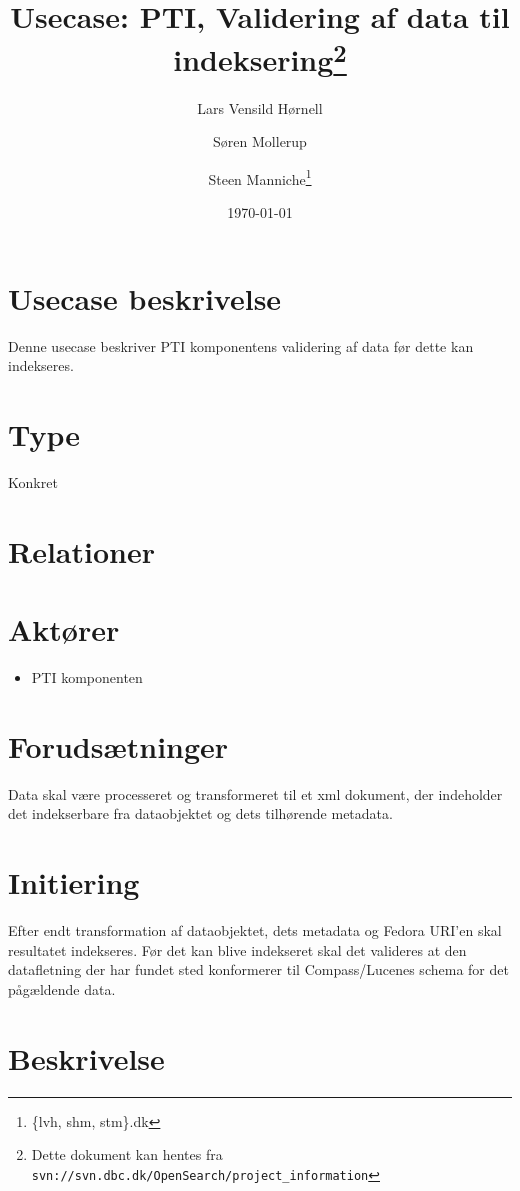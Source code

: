 \documentclass{article}
\author{Lars Vensild Hørnell \and Søren Mollerup \and Steen
  Manniche\thanks{\{lvh, shm, stm\}\@dbc.dk}}
\date{\today}
\title{Usecase: PTI, Validering af data til indeksering\thanks{Dette dokument kan hentes fra \texttt{svn://svn.dbc.dk/OpenSearch/project\_information}}}
\begin{document}
\maketitle

\newpage

\tableofcontents


\section{Usecase beskrivelse}
Denne usecase beskriver PTI komponentens validering af data før dette
kan indekseres.

\section{Type}
Konkret


\section{Relationer}


\section{Aktører}

\begin{itemize}
\item PTI komponenten
\end{itemize}

\section{Forudsætninger}

Data skal være processeret og transformeret til et xml dokument, der
indeholder det indekserbare fra dataobjektet og dets tilhørende metadata.


\section{Initiering}

Efter endt transformation af dataobjektet, dets metadata og Fedora
URI'en skal resultatet indekseres. Før det kan blive indekseret skal
det valideres at den datafletning der har fundet sted konformerer til
Compass/Lucenes schema for det pågældende data.


\section{Beskrivelse}
\end{document}
